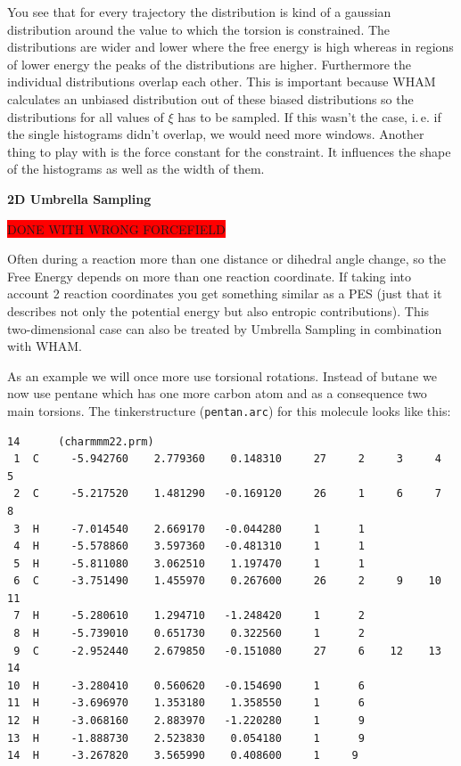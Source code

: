 \documentclass[a4paper,11pt]{scrartcl}
\begin{document}
You see that for every trajectory the distribution is kind of a gaussian distribution around the value to which the torsion is constrained. The distributions are wider and lower where the free energy is high whereas in regions of lower energy the peaks of the distributions are higher. Furthermore the individual distributions overlap each other. This is important because WHAM calculates an unbiased distribution out of these biased distributions so the distributions for all values of $\xi$ has to be sampled. If this wasn't the case, i.\,e. if the single histograms didn't overlap, we would need more windows. Another thing to play with is the force constant for the constraint. It influences the shape of the histograms as well as the width of them.\supercite{mills_experimentally_2008}

\FloatBarrier

\textbf{2D Umbrella Sampling}

\colorbox{red}{DONE WITH WRONG FORCEFIELD}

Often during a reaction more than one distance or dihedral angle change, so the Free Energy depends on more than one reaction coordinate. If taking into account 2 reaction coordinates you get something similar as a PES (just that it describes not only the potential energy but also entropic contributions). This two-dimensional case can also be treated by Umbrella Sampling in combination with WHAM.

As an example we will once more use torsional rotations. Instead of butane we now use pentane which has one more carbon atom and as a consequence two main torsions. The tinkerstructure (\texttt{pentan.arc}) for this molecule looks like this:
\begin{lstlisting}[frame=single,]
14      (charmmm22.prm)
 1  C     -5.942760    2.779360    0.148310     27     2     3     4     5
 2  C     -5.217520    1.481290   -0.169120     26     1     6     7     8
 3  H     -7.014540    2.669170   -0.044280     1      1
 4  H     -5.578860    3.597360   -0.481310     1      1
 5  H     -5.811080    3.062510    1.197470     1      1
 6  C     -3.751490    1.455970    0.267600     26     2     9    10    11
 7  H     -5.280610    1.294710   -1.248420     1      2
 8  H     -5.739010    0.651730    0.322560     1      2
 9  C     -2.952440    2.679850   -0.151080     27     6    12    13    14
10  H     -3.280410    0.560620   -0.154690     1      6
11  H     -3.696970    1.353180    1.358550     1      6
12  H     -3.068160    2.883970   -1.220280     1      9
13  H     -1.888730    2.523830    0.054180     1      9
14  H     -3.267820    3.565990    0.408600     1     9
\end{lstlisting}
\end{document}
